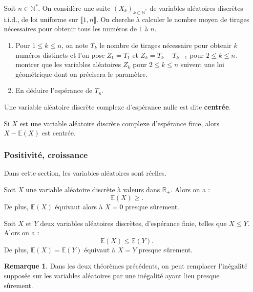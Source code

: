 \documentclass[french]{article}
\newcommand{\N}{\mathbb{N}}
\newcommand{\R}{\mathbb{R}}
\newcommand{\st}{^*}
\newcommand{\E}{\mathbb{E}}
\theoremstyle{plain}
\theoremstyle{definition}
\newtheorem*{rmq}{Remarque}
\theoremstyle{remark}
\begin{document}
\begin{exo}
	Soit $n\in\N\st$. On considère une suite $(X_k)_{k\in\N\st}$ de variables aléatoires discrètes i.i.d., de loi uniforme sur $\llbracket1,n\rrbracket$. On cherche à calculer le nombre moyen de tirages nécessaires pour obtenir tous les numéros de $1$ à $n$.
	\begin{enumerate}
		\item Pour $1\leqslant k\leqslant n$, on note $T_k$ le nombre de tirages nécessaire pour obtenir $k$ numéros distincts et l'on pose $Z_1=T_1$ et $Z_k=T_k-T_{k-1}$ pour $2\leqslant k\leqslant n$. \\
		montrer que les variables aléatoires $Z_k$ pour $2\leqslant k\leqslant n$ suivent une loi géométrique dont on précisera le paramètre.
		\item En déduire l'espérance de $T_n$.
	\end{enumerate}
\end{exo}

\begin{dfn}
	Une variable aléatoire discrète complexe d'espérance nulle est dite \textbf{centrée}.
\end{dfn}

\begin{cor}{}%
	Si $X$ est une variable aléatoire discrète complexe d'espérance finie, alors $X-\E(X)$ est centrée.
\end{cor}

\subsubsection*{Positivité, croissance}

Dans cette section, les variables aléatoires sont réelles.

\begin{prop}%
	Soit $X$ une variable aléatoire discrète à valeurs dans $\R_+$. Alors on a : $$\E(X)\geqslant.$$
	De plus, $\E(X)$ équivaut alors à $X=0$ presque sûrement.
\end{prop}

\begin{cor}%
	Soit $X$ et $Y$ deux variables aléatoires discrètes, d'espérance finie, telles que $X\leqslant Y$. Alors on a :
	$$\E(X)\leqslant\E(Y).$$
	De plus, $\E(X)=\E(Y)$ équivaut à $X=Y$ presque sûrement.
\end{cor}

\begin{rmq}
	Dans les deux théorèmes précédents, on peut remplacer l'inégalité supposée sur les variables aléatoires par une inégalité ayant lieu presque sûrement.
\end{rmq}
\end{document}
